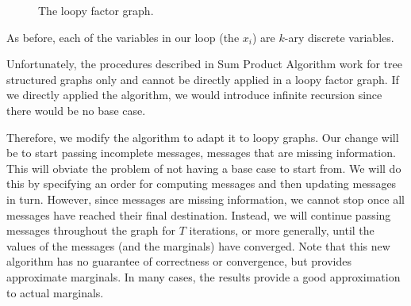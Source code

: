 \documentclass[11pt]{article}
\begin{document}
\begin{figure}[h]
	\begin{center}
		\caption{The loopy factor graph.}
			\label{fig:loopy_graph}
		\end{center}
\end{figure}
As before, each of the variables in our loop (the $x_i$) are $k$-ary discrete variables.

Unfortunately, the procedures described in Sum Product Algorithm work for tree structured graphs only and cannot be directly applied in a loopy factor graph. If we directly applied the algorithm, we would introduce infinite recursion
since there would be no base case. 

Therefore, we modify the algorithm to adapt it to loopy graphs. Our change will be to start passing incomplete messages,
messages that are missing information. This will obviate the problem of not having a base case to start from.
We will do this by specifying an order for computing messages and then updating messages in turn. 
However, since messages are missing information, we cannot stop once all messages have reached their final destination.
Instead, we will continue passing messages throughout the graph for $T$ iterations, or more generally, until the values
of the messages (and the marginals) have converged.
Note that this new algorithm has no guarantee of correctness or convergence, but provides approximate marginals.
In many cases, the results provide a good approximation to actual marginals.
\end{document}
